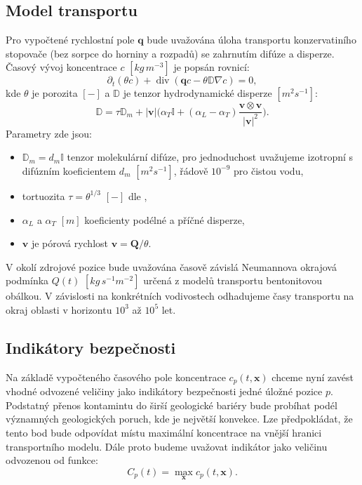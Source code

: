 \documentclass{article}
\def\abs#1{\lvert#1\rvert}
\def\prtl{\partial}
\def\grad{\nabla}
\def\div{\operatorname{div}}
\def\vc#1{\mathbf{\boldsymbol{#1}}}     %
\def\tn#1{{\mathbb{#1}}}    %
\begin{document}
\subsection{Model transportu}
\label{sec:stopovac}
Pro vypočtené rychlostní pole $\vc q$ bude uvažována úloha transportu konzervatiního stopovače (bez sorpce do horniny a rozpadů) 
se zahrnutím difúze a disperze. Časový vývoj koncentrace $c$ $[kg\, m^{-3}]$ je popsán rovnicí:
\[
   \prtl_t (\theta c) + \div( \vc q c - \theta \tn D \grad c) = 0,
\]
kde $\theta$ je porozita $[-]$ a $\tn D$ je tenzor hydrodynamické disperze $[m^2s^{-1}]$:
\[
  \tn D = \tau\tn D_m + \abs{\vc v}\Big(\alpha_T \tn I + (\alpha_L - \alpha_T)\frac{\vc v \otimes \vc v}{\abs{\vc v}^2}\Big).
\]
Parametry zde jsou:
\begin{itemize}
 \item $\tn D_m = d_m \tn I$ tenzor molekulární difúze, pro jednoduchost uvažujeme izotropní s difúzním koeficientem $d_m$ $[m^2s^{-1}]$, řádově $10^{-9}$ pro čistou vodu,
 \item tortuozita $\tau=\theta^{1/3}$ $[-]$ dle \cite{millington_quirk},
 \item $\alpha_L$ a $\alpha_T$ $[m]$ koeficienty podélné a příčné disperze,
 \item $\vc v$ je pórová rychlost $\vc v = \vc Q / \theta$.
\end{itemize}

V okolí zdrojové pozice bude uvažována časově závislá Neumannova okrajová podmínka $Q(t)$ $[kg\, s^{-1}m^{-2}]$
určená z modelů transportu bentonitovou obálkou. V závislosti na konkrétních vodivostech odhadujeme časy 
transportu na okraj oblasti v horizontu $10^3$ až $10^5$ let. 



\subsection{Indikátory bezpečnosti}
Na základě vypočteného časového pole koncentrace $c_p(t, \vc x)$ chceme nyní zavést vhodné odvozené veličiny jako indikátory bezpečnosti 
jedné úložné pozice $p$. Podstatný přenos kontamintu do širší geologické bariéry bude probíhat podél významných geologických poruch, 
kde je největší konvekce. Lze předpokládat, že tento bod bude odpovídat místu maximální koncentrace na vnější hranici transportního modelu. 
Dále proto budeme uvažovat indikátor jako veličinu odvozenou od funkce:
\[
  C_p(t) = \max_{\vc x} c_p(t, \vc x).
\]
\end{document}
